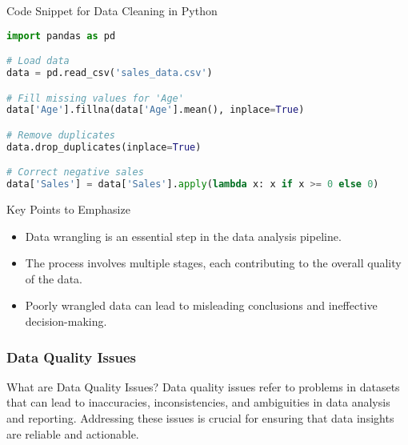 \documentclass[aspectratio=169]{beamer}
\begin{document}
\begin{frame}[fragile]{Code Snippet for Data Cleaning in Python}
    \begin{lstlisting}[language=Python]
import pandas as pd

# Load data
data = pd.read_csv('sales_data.csv')

# Fill missing values for 'Age'
data['Age'].fillna(data['Age'].mean(), inplace=True)

# Remove duplicates
data.drop_duplicates(inplace=True)

# Correct negative sales
data['Sales'] = data['Sales'].apply(lambda x: x if x >= 0 else 0)
    \end{lstlisting}
\end{frame}

\begin{frame}[fragile]{Key Points to Emphasize}
    \begin{itemize}
        \item Data wrangling is an essential step in the data analysis pipeline.
        \item The process involves multiple stages, each contributing to the overall quality of the data.
        \item Poorly wrangled data can lead to misleading conclusions and ineffective decision-making.
    \end{itemize}
\end{frame}

\begin{frame}[fragile]
    \frametitle{Data Quality Issues}
    \begin{block}{What are Data Quality Issues?}
    Data quality issues refer to problems in datasets that can lead to inaccuracies, 
    inconsistencies, and ambiguities in data analysis and reporting. Addressing these issues 
    is crucial for ensuring that data insights are reliable and actionable.
    \end{block}
\end{frame}
\end{document}
